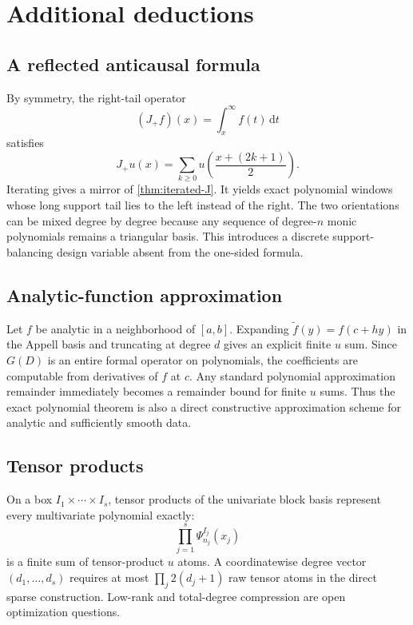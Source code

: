 \documentclass[11pt]{article}
\theoremstyle{definition}
\theoremstyle{remark}
\newcommand{\1}{\mathbf{1}}
\newcommand{\dd}{\,\mathrm{d}}
\begin{document}
\section{Additional deductions}

\subsection{A reflected anticausal formula}

By symmetry, the right-tail operator
\begin{equation}
 (J_+f)(x)=\int_x^{\infty}f(t)\dd t
 \label{eq:Jplus}
\end{equation}
satisfies
\begin{equation}
 J_+u(x)=\sum_{k\geq0}u\!\left(\frac{x+(2k+1)}2\right).
 \label{eq:right-antiderivative}
\end{equation}
Iterating gives a mirror of \cref{thm:iterated-J}.  It yields exact polynomial
windows whose long support tail lies to the left instead of the right.  The two
orientations can be mixed degree by degree because any sequence of degree-$n$
monic polynomials remains a triangular basis.  This introduces a discrete
support-balancing design variable absent from the one-sided formula.

\subsection{Analytic-function approximation}

Let $f$ be analytic in a neighborhood of $[a,b]$.  Expanding
$\widetilde f(y)=f(c+hy)$ in the Appell basis and truncating at degree $d$ gives
an explicit finite $u$ sum.  Since $G(D)$ is an entire formal operator on
polynomials, the coefficients are computable from derivatives of $f$ at $c$.
Any standard polynomial approximation remainder immediately becomes a remainder
bound for finite $u$ sums.  Thus the exact polynomial theorem is also a direct
constructive approximation scheme for analytic and sufficiently smooth data.

\subsection{Tensor products}

On a box $I_1\times\cdots\times I_s$, tensor products of the univariate block
basis represent every multivariate polynomial exactly:
\begin{equation}
 \prod_{j=1}^{s}\Psi_{n_j}^{I_j}(x_j)
 \label{eq:tensor-basis}
\end{equation}
is a finite sum of tensor-product $u$ atoms.  A coordinatewise degree vector
$(d_1,\ldots,d_s)$ requires at most
$\prod_j2(d_j+1)$ raw tensor atoms in the direct sparse construction.  Low-rank
and total-degree compression are open optimization questions.
\end{document}
